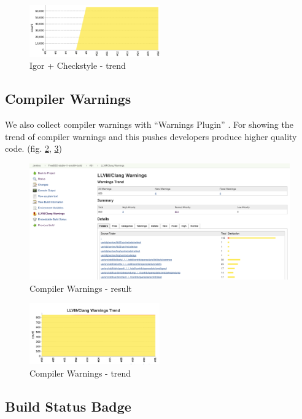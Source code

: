 \documentclass[a4paper,twocolumn,10pt]{article}
\begin{document}
\begin{figure}
\centering
\includegraphics[width=0.5\textwidth]{checkstyle-trend.png}
\caption{Igor + Checkstyle - trend}
\label{checkstyle-trend}
\end{figure}

\subsection{Compiler Warnings}

We also collect compiler warnings with ``Warnings Plugin''
\cite{jenkins-warnings-plugin}. For showing the trend of compiler
warnings and this pushes developers produce higher quality code. (fig.
\ref{compiler-result}, \ref{compiler-trend})

\begin{figure}
\includegraphics[width=\textwidth]{compiler-result.png}
\caption{Compiler Warnings - result}
\label{compiler-result}
\end{figure}

\begin{figure}
\centering
\includegraphics[width=0.5\textwidth]{compiler-trend.png}
\caption{Compiler Warnings - trend}
\label{compiler-trend}
\end{figure}

\subsection{Build Status Badge}
\end{document}
